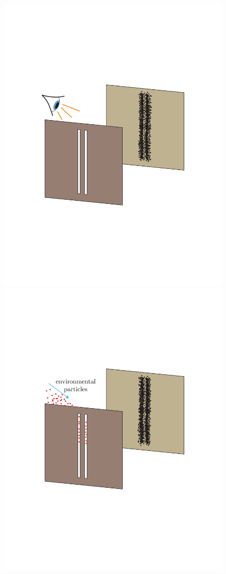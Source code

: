 \documentclass[3p,sort&compress]{elsarticle}
\begin{document}
\begin{figure}
\includegraphics[scale=.33]{dslook_new.pdf}\hspace{.7cm}
\includegraphics[scale=.33]{dslook_scatt.pdf}

\end{figure}
\end{document}
